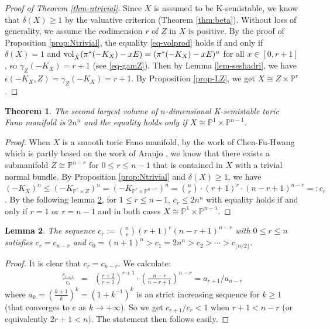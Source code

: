 \documentclass[12pt]{amsart}
\newtheorem{thm}{Theorem}[section]
\newtheorem{lem}[thm]{Lemma}
\theoremstyle{definition}
\def\vol{{\rm vol}}
\newcommand{\IP}{{\mathbb P}}
\newcommand{\lee}{\leqslant}
\newcommand{\gee}{\geqslant}
\begin{document}
\begin{proof}[Proof of Theorem \ref{thm-ntrivial}] 
 Since $X$ is assumed to be K-semistable, we know that $\delta(X)\ge 1$ by the valuative criterion (Theorem \ref{thm:beta}). Without loss of generality, we assume the codimension $r$ of $Z$ in $X$ is positive. By the proof of Proposition \ref{prop:Ntrivial}, the equality \eqref{eq-volprod} holds if and only if $\delta(X)=1$ and $\vol_{\hat{X}}(\pi^*(-K_X)-xE)=(\pi^*(-K_X)-xE)^n$ for all $x\in [0,r+1]$, so $\gamma_{Z}(-K_X)=r+1$ (see \eqref{eq-gamZ}). Then by Lemma \ref{lem-seshadri}, we have $\epsilon(-K_X,Z)=\gamma_Z(-K_X)=r+1$. By Proposition 
 \ref{prop-LZ}, we get $X\cong Z\times \IP^r$. 
\end{proof}
\begin{thm}\label{thm:toricsm}
     The second largest volume of $n$-dimensional K-semistable toric Fano manifold is $2n^n$ and the equality holds only if $X\cong \IP^1\times \IP^{n-1}$. 
\end{thm}
\begin{proof}
    When $X$ is a smooth toric Fano manifold, by the work of Chen-Fu-Hwang \cite[Corollary 2.5]{CFH14} which is partly based on the work of Araujo \cite{Ara06}, we know that there exists a submanifold $Z \cong \IP^{n-r}$ for $0\le r\le n-1$ that is contained in $X$ with a trivial normal bundle. By Proposition \ref{prop:Ntrivial} and $\delta(X)\gee 1$, we have $(-K_X)^n\lee (-K_{\IP^r\times Z})^n = (-K_{\IP^r\times \IP^{n-r}})^n=\binom{n}{r}\cdot (r+1)^r\cdot (n-r+1)^{n-r}=: c_r$. By the following lemma \ref{lem-cr}, for $1\le r\le n-1$,  $c_r\le 2n^n$ with equality holds if and only if $r=1$ or $r=n-1$ and in both cases $X\cong \IP^1\times \IP^{n-1}$. 
\end{proof}

\begin{lem}\label{lem-cr}
The sequence $c_{r}:=\binom{n}{r}(r+1)^r (n-r+1)^{n-r}$
with $0\le r\le n$ satisfies $c_r=c_{n-r}$ and $c_0=(n+1)^n>c_1=2n^n>c_2>\cdots> c_{\lfloor n/2\rfloor}$. 
\end{lem}
\begin{proof}
It is clear that $c_r=c_{n-r}$. We calculate:
\begin{eqnarray*}
   \frac{c_{r+1}}{c_r}&=&\left(\frac{r+2}{r+1}\right)^{r+1}\cdot \left(\frac{n-r}{n-r+1}\right)^{n-r}=a_{r+1}/a_{n-r}
\end{eqnarray*}
where $a_k=(\frac{k+1}{k})^k=(1+k^{-1})^k$ is an strict increasing sequence for $k\ge 1$ (that converges to $e$ as $k\rightarrow +\infty$). So we get $c_{r+1}/{c_r}<1$ when $r+1<n-r$ (or equivalently $2r+1<n)$.  The statement then follows easily. 
\end{proof}
\end{document}
